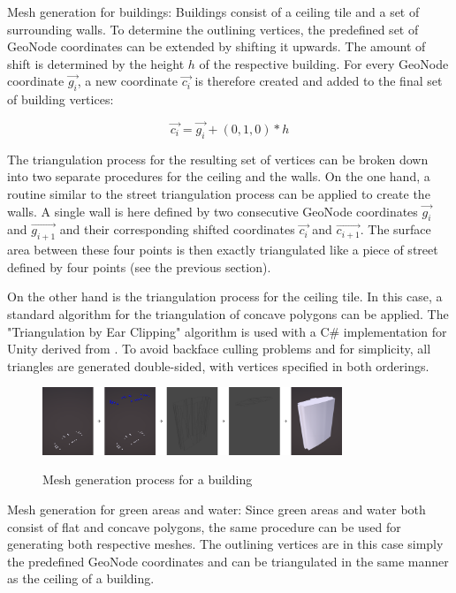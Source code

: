 Mesh generation for buildings: Buildings consist of a ceiling tile and a set of surrounding walls. To determine the outlining vertices, the predefined set of GeoNode coordinates can be extended by shifting it upwards. The amount of shift is determined by the height $h$ of the respective building. For every GeoNode coordinate $\vec{g_{i}}$, a new coordinate $\vec{c_{i}}$ is therefore created and added to the final set of building vertices:

\[\vec{c_{i}} = \vec{g_{i}} + (0, 1, 0) * h\]

The triangulation process for the resulting set of vertices can be broken down into two separate procedures for the ceiling and the walls. On the one hand, a routine similar to the street triangulation process can be applied to create the walls. A single wall is here defined by two consecutive GeoNode coordinates $\vec{g_{i}}$ and $\vec{g_{i + 1}}$ and their corresponding shifted coordinates $\vec{c_{i}}$ and $\vec{c_{i + 1}}$. The surface area between these four points is then exactly triangulated like a piece of street defined by four points (see the previous section).

On the other hand is the triangulation process for the ceiling tile. In this case, a standard algorithm for the triangulation of concave polygons can be applied. The "Triangulation by Ear Clipping" \cite{triangulation_by_ear_clipping} algorithm is used with a C\# implementation for Unity derived from \cite{triangulation_unity_library}. To avoid backface culling problems and for simplicity, all triangles are generated double-sided, with vertices specified in both orderings.

\begin{figure}[H]
	\centering
	\includegraphics[width=0.8\textwidth]{images/building_mesh_generation.png}\\
	\caption{Mesh generation process for a building}
\end{figure}

Mesh generation for green areas and water: Since green areas and water both consist of flat and concave polygons, the same procedure can be used for generating both respective meshes. The outlining vertices are in this case simply the predefined GeoNode coordinates and can be triangulated in the same manner as the ceiling of a building.

